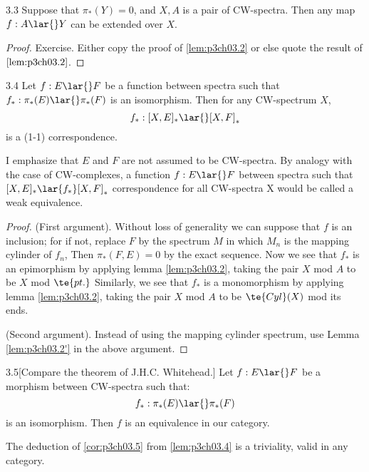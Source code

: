 \documentclass[../main]{subfiles}
\begin{document}
\begin{customlemma}{3.3} \label{lem:p3ch03.3}
Suppose that $\pi_\ast(Y)=0$, and $X,A$ is a pair of CW-spectra. Then any map $f:A\lar{}Y$ can be extended over $X$.
\end{customlemma}
\begin{proof}
Exercise. Either copy the proof of \ref{lem:p3ch03.2} or else quote the result of $\ref{lem:p3ch03.2}$.
\end{proof}

\begin{customthm}{3.4}\label{lem:p3ch03.4}
Let $f:E\lar{}F$ be a function between spectra such that $f_\ast:\pi_\ast(E)\lar{} \pi_\ast(F)$ is an isomorphism. Then for any CW-spectrum $X$, \[f_\ast:[X,E]_\ast \lar{}[X,F]_\ast\] is a (1-1) correspondence.
\end{customthm}
I emphasize that $E$ and $F$ are not assumed to be CW-spectra.
By analogy with the case of CW-complexes, a function $f: E\lar{} F$
between spectra such that $ [X,E]_\ast \lar{f_\ast}[X,F]_\ast$ correspondence
for all CW-spectra X would be called a weak equivalence. 

\begin{proof}
(First argument). Without loss of generality we
can suppose that $f$ is an inclusion; for if not, replace $F$ by the
spectrum $M$ in which $M_n$ is the mapping cylinder of $f_n$, Then
$\pi_\ast(F,E) = 0$ by the exact sequence. Now we see that $f_\ast$ is an epimorphism by applying lemma \ref{lem:p3ch03.2}, taking the pair $X$ mod $A$ to be $X$ mod $\te{pt.}$
Similarly, we see that $f_\ast$ is a monomorphism by applying lemma \ref{lem:p3ch03.2}, taking the pair $X$ mod $A$ to be $\te{Cyl}(X)$ mod its ends.

(Second argument). Instead of using the mapping cylinder spectrum,
use Lemma \ref{lem:p3ch03.2'} in the above argument. 
\end{proof}

\begin{customcor}{3.5}[Compare the theorem of J.H.C. Whitehead.] \label{cor:p3ch03.5} Let $f:E\lar{}F$ be a morphism between CW-spectra such that:
\[f_\ast:\pi_\ast(E)\lar{} \pi_\ast(F)\]
is an isomorphism. Then $f$ is an equivalence in our category. 
\end{customcor}
The deduction of \ref{cor:p3ch03.5} from \ref{lem:p3ch03.4} is a triviality, valid in any category. 
\end{document}
